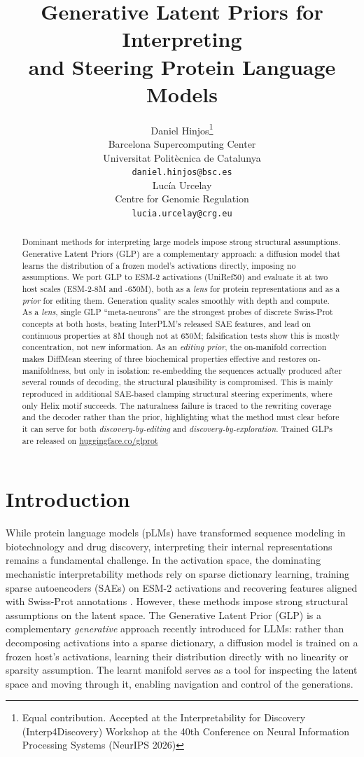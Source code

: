\documentclass{article}
\title{\Large {Generative Latent Priors for Interpreting \\ and Steering Protein Language Models}}
\author{%
  Daniel Hinjos\thanks{Equal contribution. Accepted at the Interpretability for Discovery (Interp4Discovery) Workshop at the 40th Conference on Neural Information Processing Systems (NeurIPS 2026)} \\ %
  Barcelona Supercomputing Center \\
  Universitat Politècnica de Catalunya \\
  \texttt{daniel.hinjos@bsc.es} \\
  \And
  Lucía Urcelay\footnotemark[1] \\
  Centre for Genomic Regulation \\
  \texttt{lucia.urcelay@crg.eu} \\
}
\begin{document}
\maketitle
\renewcommand{\thefootnote}{}
\renewcommand{\thefootnote}{\arabic{footnote}}


\begin{abstract}
Dominant methods for interpreting large models impose strong structural assumptions. Generative Latent Priors (GLP) are a complementary approach: a diffusion
model that learns the distribution of a frozen model's activations directly, imposing no
assumptions. We port GLP to ESM-2 activations (UniRef50) and evaluate it
at two host scales (ESM-2-8M and -650M), both as a \textit{lens} for protein representations and
as a \textit{prior} for editing them. Generation quality scales smoothly with depth and compute. As a
\emph{lens}, single GLP ``meta-neurons'' are the strongest probes of discrete
Swiss-Prot concepts at both hosts, beating InterPLM's released SAE features, and lead on
continuous properties at 8M though not at 650M; falsification tests show this is mostly concentration, not new information. As an \emph{editing prior}, the on-manifold
correction makes DiffMean steering of three biochemical properties effective and restores on-manifoldness, but only in isolation: re-embedding the sequences actually produced after several rounds of decoding, the structural plausibility is compromised. This is mainly reproduced in additional SAE-based clamping structural steering experiments, where only Helix motif succeeds. The naturalness failure
is traced to the rewriting coverage and the decoder rather than the prior, highlighting what the method must clear
before it can serve for both \emph{discovery-by-editing} and \emph{discovery-by-exploration}. Trained GLPs are released on \href{https://huggingface.co/collections/HPAI-BSC/glprot}{huggingface.co/glprot}
 
\end{abstract}
\section{Introduction}

While protein language models (pLMs) have transformed sequence modeling in biotechnology and drug discovery, interpreting their internal representations remains a fundamental challenge. In the activation space, the dominating mechanistic interpretability methods rely on sparse
dictionary learning, training sparse autoencoders (SAEs) on ESM-2 \cite{lin2023esm2} activations and recovering features aligned with Swiss-Prot annotations \cite{simon2024interplm,gujral2025sparse,adams2025mechanistic}. However, these methods impose strong structural assumptions on the latent space. The Generative Latent Prior (GLP) \cite{luo2026glp} is a complementary \emph{generative} approach recently introduced for LLMs:
rather than decomposing activations into a sparse dictionary, a diffusion model is trained on a
frozen host's activations, learning their distribution directly with no linearity or sparsity
assumption. The learnt manifold serves as a tool for inspecting the latent space and moving through it, enabling navigation and control of the generations. 
\end{document}
